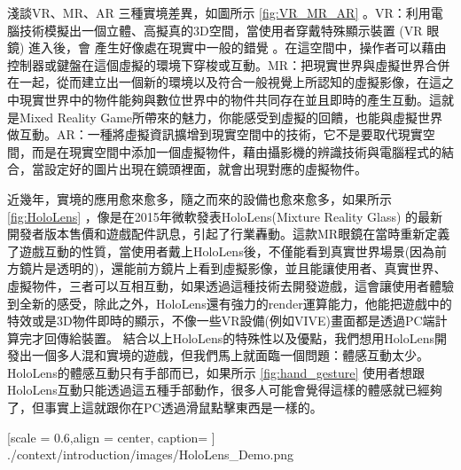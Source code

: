 
淺談VR、MR、AR 三種實境差異，如圖所示 \ref{fig:VR_MR_AR} 。VR：利用電腦技術模擬出一個立體、高擬真的3D空間，當使用者穿戴特殊顯示裝置 (VR 眼鏡) 進入後，會 產生好像處在現實中一般的錯覺 。在這空間中，操作者可以藉由控制器或鍵盤在這個虛擬的環境下穿梭或互動。MR：把現實世界與虛擬世界合併在一起，從而建立出一個新的環境以及符合一般視覺上所認知的虛擬影像，在這之中現實世界中的物件能夠與數位世界中的物件共同存在並且即時的產生互動。這就是Mixed Reality Game所帶來的魅力，你能感受到虛擬的回饋，也能與虛擬世界做互動。AR：一種將虛擬資訊擴增到現實空間中的技術，它不是要取代現實空間，而是在現實空間中添加一個虛擬物件，藉由攝影機的辨識技術與電腦程式的結合，當設定好的圖片出現在鏡頭裡面，就會出現對應的虛擬物件。


近幾年，實境的應用愈來愈多，隨之而來的設備也愈來愈多，如果所示 \ref{fig:HoloLens} ，像是在2015年微軟發表HoloLens(Mixture Reality Glass) 的最新開發者版本售價和遊戲配件訊息，引起了行業轟動。這款MR眼鏡在當時重新定義了遊戲互動的性質，當使用者戴上HoloLens後，不僅能看到真實世界場景(因為前方鏡片是透明的)，還能前方鏡片上看到虛擬影像，並且能讓使用者、真實世界、虛擬物件，三者可以互相互動，如果透過這種技術去開發遊戲，這會讓使用者體驗到全新的感受，除此之外，HoloLens還有強力的render運算能力，他能把遊戲中的特效或是3D物件即時的顯示，不像一些VR設備(例如VIVE)畫面都是透過PC端計算完才回傳給裝置。
結合以上HoloLens的特殊性以及優點，我們想用HoloLens開發出一個多人混和實境的遊戲，但我們馬上就面臨一個問題：體感互動太少。HoloLens的體感互動只有手部而已，如果所示 \ref{fig:hand_gesture} 使用者想跟HoloLens互動只能透過這五種手部動作，很多人可能會覺得這樣的體感就已經夠了，但事實上這就跟你在PC透過滑鼠點擊東西是一樣的。

%
{   
	[scale = 0.6,align = center, caption={ } ]
	{./context/introduction/images/HoloLens_Demo.png}
}%


